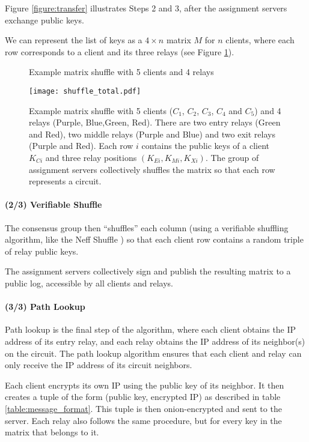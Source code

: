 Figure \ref{figure:transfer} illustrates Steps 2 and 3, after the assignment
servers exchange public keys.

We can represent the list of keys as a $4 \times n$ matrix $M$ for $n$
clients, where each row corresponds to a client and its three relays (see
Figure \ref{figure:shuffle}).

\begin{figure}
	\caption{Example matrix shuffle with 5 clients and 4 relays}
  \centering
    \texttt{[image: shuffle\_total.pdf]}
  \caption{Example matrix shuffle with 5 clients ($C_1$, $C_2$, $C_3$, $C_4$ and $C_5$) and 4
relays (Purple, Blue,Green, Red). There are two entry relays (Green and Red),
two middle relays (Purple and Blue) and two exit relays (Purple and Red). Each
row $i$ contains the public keys of a client $K_{Ci}$ and three relay positions
$(K_{Ei}, K_{Mi}, K_{Xi})$. The group of assignment servers collectively shuffles
the matrix so that each row represents a circuit.}
  \label{figure:shuffle}
\end{figure}


\paragraph{(2/3) Verifiable Shuffle} The consensus group then ``shuffles''
each column (using a verifiable shuffling algorithm, like the Neff Shuffle
\cite{neff2001verifiable}) so that each client row contains a random triple of
relay public keys.

The assignment servers collectively sign and publish the resulting matrix to a
public log, accessible by all clients and relays.

\paragraph{(3/3) Path Lookup}
Path lookup is the final step of the algorithm, where each client obtains the
IP address of its entry relay, and each relay obtains the IP address of its
neighbor(s) on the circuit. The path lookup algorithm ensures that each client
and relay can only receive the IP address of its circuit neighbors.

Each client encrypts its own IP using the public key of its neighbor. It then
creates a tuple of the form (public key, encrypted IP) as described in table
\ref{table:message_format}. This tuple is then onion-encrypted and sent to the
server.  Each relay also follows the same procedure, but for every key in the
matrix that belongs to it.

